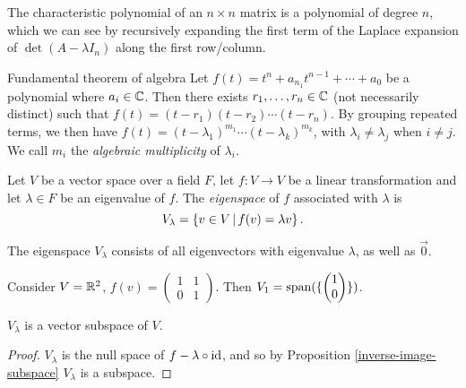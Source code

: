 \begin{rmk}
    The characteristic polynomial of an $n \times n$ matrix is a polynomial of degree $n$, which we can see by recursively expanding the first term of the Laplace expansion of $\det(A - \lambda I_n)$ along the first row/column.
\end{rmk}

\begin{thm}{Fundamental theorem of algebra}\proofbreak
    Let $f(t) = t^n + a_{n_1}t^{n-1} + \cdots + a_0$ be a polynomial where $a_i \in \mathbb{C}$. Then there exists $r_1, \ldots, r_n \in \mathbb{C}$ (not necessarily distinct) such that $f(t) = (t -r_1)(t-r_2)\cdots(t-r_n)$. By grouping repeated terms, we then have
    $f(t) = (t-\lambda_1)^{m_1}\cdots (t-\lambda_k)^{m_k}$, with $\lambda_i \neq \lambda_j$ when $i \neq j$. We call $m_i$ the \emph{algebraic multiplicity} of $\lambda_i$.
\end{thm}

\begin{defn}
    Let $V$ be a vector space over a field $F$, let $f: V \to V$ be a linear transformation and let $\lambda \in F$ be an eigenvalue of $f$. The \emph{eigenspace} of $f$ associated with $\lambda$ is
    \[V_{\lambda} = \left\{v \in V \,\middle|\, f(v) = \lambda v\right\}.\]
\end{defn}

\begin{rmk}
    The eigenspace $V_{\lambda}$ consists of all eigenvectors with eigenvalue $\lambda$, as well as $\vec{0}$.
\end{rmk}

\begin{exmp}
    Consider $V = \mathbb{R}^2$, $f(v) = \begin{pmatrix}1 & 1 \\ 0 & 1\end{pmatrix}$. Then $V_1 = \operatorname{span}(\{\begin{pmatrix}1 \\ 0\end{pmatrix}\})$.
\end{exmp}

\begin{lemma}\label{eigen-subspace}
    $V_{\lambda}$ is a vector subspace of $V$.
\end{lemma}

\begin{proof}
    $V_{\lambda}$ is the null space of $f - \lambda \circ \operatorname{id}$, and so by Proposition \ref{inverse-image-subspace} $V_{\lambda}$ is a subspace.
\end{proof}

